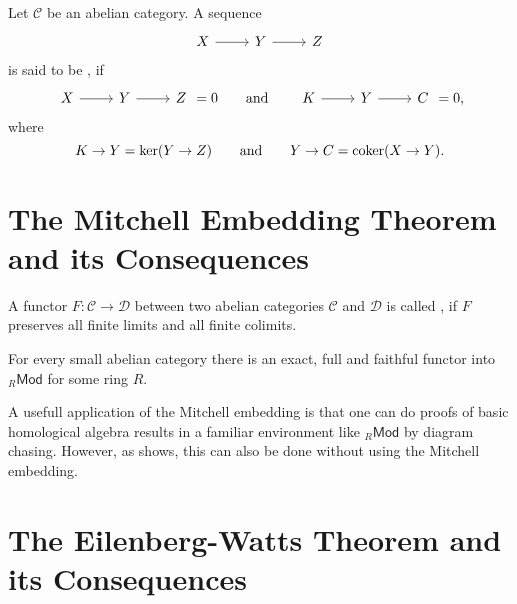 \begin{definition}[Exactness]
	Let $\mathcal{C}$ be an abelian category. A sequence
	\begin{equation*}
		\begin{tikzcd}
			X \arrow[r] & Y \arrow[r] & Z
		\end{tikzcd}
	\end{equation*}
	\noindent is said to be , if 
	\begin{equation*}
		\begin{tikzcd}
			X \arrow[r] & Y \arrow[r] & Z 
		\end{tikzcd} = 0 \qquad \text{and} \qquad
		\begin{tikzcd}
			K \arrow[r] & Y \arrow[r] & C
		\end{tikzcd} = 0,
	\end{equation*}
	\noindent where
	\begin{equation*}
		K \to Y = \ker(Y \to Z)
		\qquad \text{and} \qquad
		Y \to C = \operatorname{coker}(X \to Y).
	\end{equation*}
\end{definition}


\section{The Mitchell Embedding Theorem and its Consequences}

\begin{definition}
	A functor $F : \mathcal{C} \to \mathcal{D}$ between two abelian categories $\mathcal{C}$ and $\mathcal{D}$ is called , if $F$ preserves all finite limits and all finite colimits.
\end{definition}

\begin{theorem}
	For every small abelian category there is an exact, full and faithful functor into $_{R}\mathsf{Mod}$ for some ring $R$.
	\label{thm:mitchell_embedding}
\end{theorem}

A usefull application of the Mitchell embedding is that one can do proofs of basic homological algebra results in a familiar environment like $_{R}\mathsf{Mod}$ by diagram chasing. However, as \cite[202--208]{maclane:categories:1978} shows, this can also be done without using the Mitchell embedding.

\section{The Eilenberg-Watts Theorem and its Consequences}

